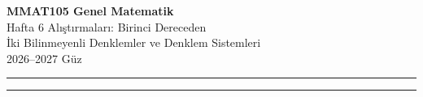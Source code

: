 \documentclass[11pt,a4paper]{article}
\newcounter{alis}
\begin{document}
\begin{minipage}[c]{\textwidth}
{\LARGE\bfseries\color{anamavi} MMAT105 Genel Matematik}\\[4pt]
{\large Hafta 6 Alıştırmaları: Birinci Dereceden\\ İki Bilinmeyenli Denklemler ve Denklem Sistemleri}\\[6pt]
{\small 2026--2027 Güz}
\end{minipage}

\vspace{4pt}\noindent\textcolor{anamavi}{\rule{\textwidth}{1pt}}



\vspace{6pt}
\noindent\textcolor{anamavi}{\rule{\textwidth}{0.5pt}}\\
{\small }
\end{document}
